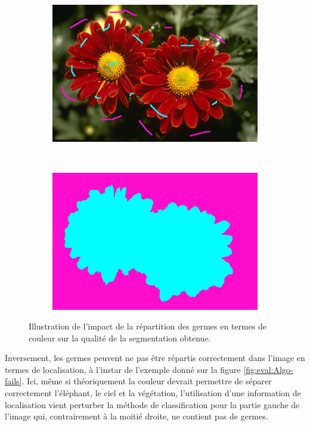 \begin{emodif}
\begin{figure}[htb]
\begin{subfigure}{0.4\textwidth}
 \end{subfigure}
 \\~\\
 \begin{subfigure}{0.4\textwidth}	
\includegraphics[width=\textwidth]{images/evaluation/fails/germes_c_02}
 \end{subfigure}
 ~
 \begin{subfigure}{0.4\textwidth}	
\includegraphics[width=\textwidth]{images/evaluation/fails/seg_c_02}
 \end{subfigure}
\caption{Illustration de l'impact de la répartition des germes en termes de couleur  sur la qualité de la segmentation obtenue.}
	\label{fig:eval:Algo-fails-c}
\end{figure} 

Inversement, les germes peuvent ne pas être répartis correctement dans l'image en termes de localisation, à l'instar de l'exemple donné sur la figure \ref{fig:eval:Algo-fails}. Ici, même si théoriquement la couleur devrait permettre de séparer correctement l'éléphant, le ciel et la végétation, l'utilisation d'une information de localisation vient perturber la méthode de classification pour la partie gauche de l'image qui, contrairement à la moitié droite, ne contient pas de germes. 


\end{emodif}
